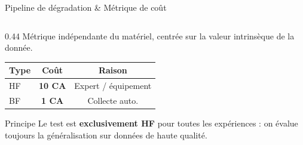 \documentclass[aspectratio=169, 10pt]{beamer}
\begin{document}
\begin{frame}{Pipeline de d\'{e}gradation \& M\'{e}trique de co\^{u}t}
\begin{columns}[T]
\begin{column}{0.44\textwidth}
      \smallskip
      M\'{e}trique ind\'{e}pendante du mat\'{e}riel, centr\'{e}e sur la valeur intrins\`{e}que de la donn\'{e}e.

      \medskip
      \renewcommand{\arraystretch}{1.4}
      \begin{tabular}{@{}lcc@{}}
        \toprule
        \color{primary}\textbf{Type} & \color{primary}\textbf{Co\^{u}t} & \color{primary}\textbf{Raison} \\
        \midrule
        \rowcolor{hfcolor!10}HF & \textbf{10 CA} & Expert / \'{e}quipement \\
        \rowcolor{bfcolor!12}BF & \textbf{1 CA}  & Collecte auto. \\
        \bottomrule
      \end{tabular}

      \medskip
      \begin{block}{Principe}
        \footnotesize Le test est \textbf{exclusivement HF} pour toutes les exp\'{e}riences : on \'{e}value toujours la g\'{e}n\'{e}ralisation sur donn\'{e}es de haute qualit\'{e}.
      \end{block}
    \end{column}
  \end{columns}
\end{frame}
\end{document}
